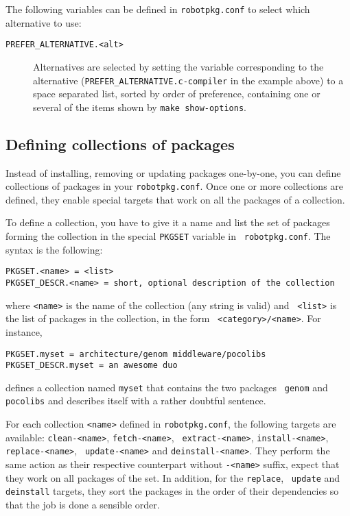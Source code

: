 The following variables can be defined  in {\tt robotpkg.conf} to select which
alternative to use:

\begin{description}
   \item[{\tt PREFER\_ALTERNATIVE.<alt>}]
   Alternatives are selected by setting the variable corresponding to the
   alternative ({\tt PREFER\_ALTERNATIVE.c-compiler} in the example above) to a
   space separated list, sorted by order of preference, containing one or
   several of the items shown by {\tt make show-options}.
\end{description}


\subsection{Defining collections of packages} %
\label{section:configuring:sets}

Instead of installing, removing or updating packages one-by-one, you can define
collections  of  packages  in  your  {\tt  robotpkg.conf}.  Once  one  or  more
collections  are defined,  they enable  special targets  that work  on  all the
packages of a collection.

To define a collection, you have to give it a name and list the set of packages
forming  the  collection   in  the  special  {\tt  PKGSET}   variable  in  {\tt
robotpkg.conf}. The syntax is the following:

\begin{verbatim}
PKGSET.<name> = <list>
PKGSET_DESCR.<name> = short, optional description of the collection
\end{verbatim}

where {\tt <name>} is the name of the collection (any string is valid) and {\tt
<list>}  is  the  list  of  packages  in  the  collection,  in  the  form  {\tt
<category>/<name>}. For instance,

\begin{verbatim}
PKGSET.myset = architecture/genom middleware/pocolibs
PKGSET_DESCR.myset = an awesome duo
\end{verbatim}

defines  a collection named  {\tt myset}  that contains  the two  packages {\tt
genom} and {\tt pocolibs} and describes itself with a rather doubtful sentence.

For each collection {\tt <name>}  defined in {\tt robotpkg.conf}, the following
targets   are   available:  {\tt   clean-<name>},   {\tt  fetch-<name>},   {\tt
extract-<name>},    {\tt    install-<name>},    {\tt   replace-<name>},    {\tt
update-<name>}  and {\tt  deinstall-<name>}. They  perform the  same  action as
their  respective counterpart without  {\tt -<name>}  suffix, expect  that they
work on  all packages  of the set.   In addition,  for the {\tt  replace}, {\tt
update} and  {\tt deinstall} targets,  they sort the  packages in the  order of
their dependencies so that the job is done a sensible order.

